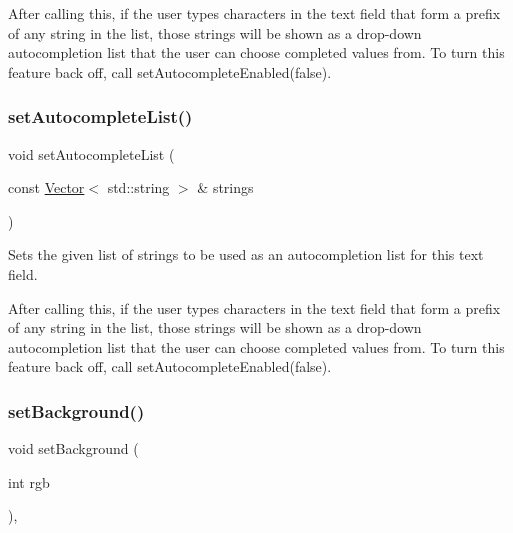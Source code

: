 After calling this, if the user types characters in the text field that form a prefix of any string in the list, those strings will be shown as a drop-\/down autocompletion list that the user can choose completed values from. To turn this feature back off, call set\+Autocomplete\+Enabled(false). \mbox{\label{classGTextField_af468683b02e61be999c76dd1100165e8}} 
\subsubsection{\texorpdfstring{set\+Autocomplete\+List()}{setAutocompleteList()}\hspace{0.1cm}{\footnotesize\ttfamily [2/2]}}
{\footnotesize\ttfamily void set\+Autocomplete\+List (\begin{DoxyParamCaption}\item[{const \mbox{\hyperlink{classVector}{Vector}}$<$ std\+::string $>$ \&}]{strings }\end{DoxyParamCaption})\hspace{0.3cm}{\ttfamily [virtual]}}



Sets the given list of strings to be used as an autocompletion list for this text field. 

After calling this, if the user types characters in the text field that form a prefix of any string in the list, those strings will be shown as a drop-\/down autocompletion list that the user can choose completed values from. To turn this feature back off, call set\+Autocomplete\+Enabled(false). \mbox{\label{classGInteractor_acba7e546c2025c0a15ca4b4cc92043db}} 
\subsubsection{\texorpdfstring{set\+Background()}{setBackground()}\hspace{0.1cm}{\footnotesize\ttfamily [1/2]}}
{\footnotesize\ttfamily void set\+Background (\begin{DoxyParamCaption}\item[{int}]{rgb }\end{DoxyParamCaption})\hspace{0.3cm}{\ttfamily [virtual]}, {\ttfamily [inherited]}}



